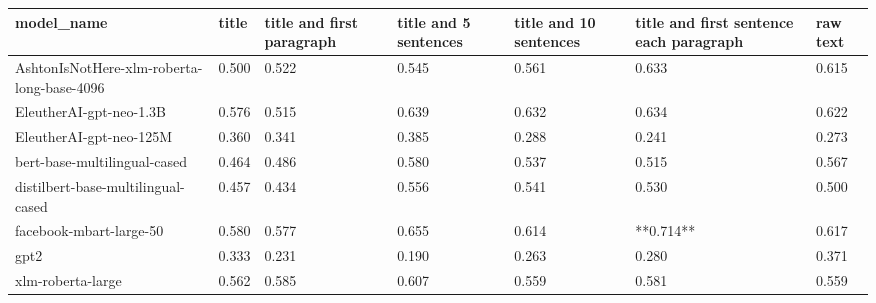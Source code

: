 \begin{tabular}{lllllll}
\toprule
                                model\_name & title & title and first paragraph & title and 5 sentences & title and 10 sentences & title and first sentence each paragraph & raw text \\
\midrule
AshtonIsNotHere-xlm-roberta-long-base-4096 & 0.500 &                     0.522 &                 0.545 &                  0.561 &                                   0.633 &    0.615 \\
                   EleutherAI-gpt-neo-1.3B & 0.576 &                     0.515 &                 0.639 &                  0.632 &                                   0.634 &    0.622 \\
                   EleutherAI-gpt-neo-125M & 0.360 &                     0.341 &                 0.385 &                  0.288 &                                   0.241 &    0.273 \\
              bert-base-multilingual-cased & 0.464 &                     0.486 &                 0.580 &                  0.537 &                                   0.515 &    0.567 \\
        distilbert-base-multilingual-cased & 0.457 &                     0.434 &                 0.556 &                  0.541 &                                   0.530 &    0.500 \\
                   facebook-mbart-large-50 & 0.580 &                     0.577 &                 0.655 &                  0.614 &                               **0.714** &    0.617 \\
                                      gpt2 & 0.333 &                     0.231 &                 0.190 &                  0.263 &                                   0.280 &    0.371 \\
                         xlm-roberta-large & 0.562 &                     0.585 &                 0.607 &                  0.559 &                                   0.581 &    0.559 \\
\bottomrule
\end{tabular}
